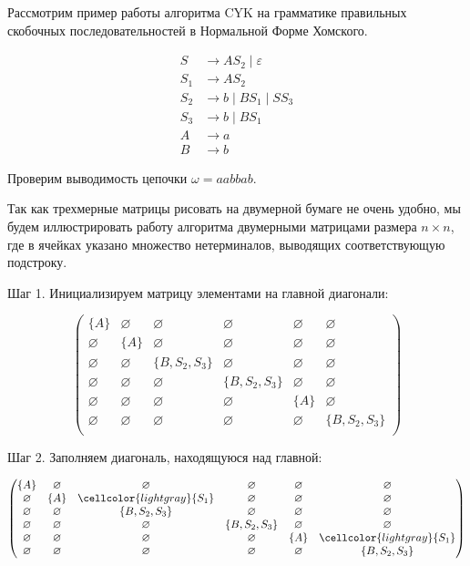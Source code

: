 \begin{example}\label{exampl:CYK}
  Рассмотрим пример работы алгоритма CYK на грамматике правильных скобочных последовательностей в Нормальной Форме Хомского.


\begin{align*}
S &\to A S_2 \mid \varepsilon \\
S_1   &\to A S_2 \\
S_2  &\to b \mid B S_1 \mid S S_3 \\
S_3 &\to b \mid B S_1 \\
A   &\to a \\
B   &\to b
\end{align*}

Проверим выводимость цепочки $\omega = a a b b a b$.

Так как трехмерные матрицы рисовать на двумерной бумаге не очень удобно, мы будем иллюстрировать работу алгоритма двумерными матрицами размера $n \times n$, где в ячейках указано множество нетерминалов, выводящих соответствующую подстроку.

Шаг 1. Инициализируем матрицу элементами на главной диагонали:

\[
\begin{pmatrix}
\{A\}       & \varnothing & \varnothing    & \varnothing      & \varnothing & \varnothing    \\
\varnothing & \{A\}       & \varnothing    & \varnothing      & \varnothing & \varnothing    \\
\varnothing & \varnothing & \{B, S_2, S_3\} & \varnothing     & \varnothing & \varnothing    \\
\varnothing & \varnothing & \varnothing    & \{B, S_2, S_3\}   & \varnothing & \varnothing   \\
\varnothing & \varnothing & \varnothing    & \varnothing      & \{A\}       & \varnothing    \\
\varnothing & \varnothing & \varnothing    & \varnothing      & \varnothing & \{B, S_2, S_3\} \\
\end{pmatrix}
\]

Шаг 2. Заполняем диагональ, находящуюся над главной:

\[
\begin{pmatrix}
\{A\}       & \varnothing & \varnothing                             & \varnothing      & \varnothing & \varnothing    \\
\varnothing & \{A\}       & \cellcolor{lightgray}\{S_1\}            & \varnothing      & \varnothing & \varnothing    \\
\varnothing & \varnothing & \{B, S_2, S_3\} & \varnothing     & \varnothing & \varnothing    \\
\varnothing & \varnothing & \varnothing    & \{B, S_2, S_3\}   & \varnothing & \varnothing   \\
\varnothing & \varnothing & \varnothing    & \varnothing      & \{A\}       & \cellcolor{lightgray}\{S_1\}            \\
\varnothing & \varnothing & \varnothing    & \varnothing      & \varnothing & \{B, S_2, S_3\} \\
\end{pmatrix}
\]


\end{example}
